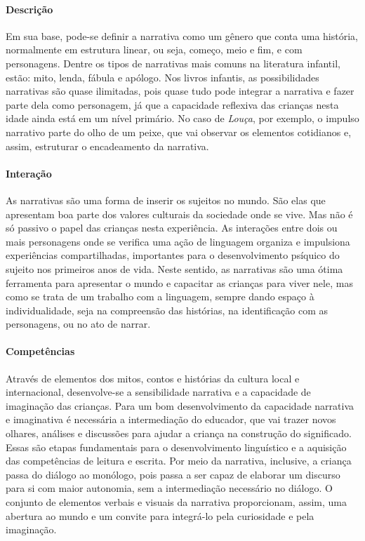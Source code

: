 \documentclass[11pt]{extarticle}
\begin{document}
\paragraph{Descrição} Em sua base, pode-se definir a narrativa como um gênero que conta uma história, normalmente em estrutura linear, ou seja, começo, meio e fim, e com personagens. 
Dentre os tipos de narrativas mais comuns na literatura infantil, estão: mito, lenda, 
fábula e apólogo. Nos livros infantis, as possibilidades narrativas são quase ilimitadas, pois quase tudo pode integrar a narrativa e fazer parte dela como personagem, já que a capacidade reflexiva das crianças nesta idade ainda está em um nível primário. No caso de \textit{Louça}, por exemplo, o impulso narrativo parte do olho de um peixe, que vai observar os elementos cotidianos e, assim, estruturar o encadeamento da narrativa.

\paragraph{Interação} As narrativas são uma forma de inserir os sujeitos no mundo. 
São elas que apresentam boa parte dos valores culturais da sociedade 
onde se vive. Mas não é só passivo o papel das crianças nesta experiência. 
As interações entre dois ou mais personagens onde se verifica
uma ação de linguagem organiza e impulsiona experiências compartilhadas,
importantes para o desenvolvimento psíquico do sujeito nos primeiros anos de vida.
Neste sentido, as narrativas são uma ótima ferramenta para
apresentar o mundo e capacitar as crianças para viver nele, mas como se
trata de um trabalho com a linguagem, sempre dando espaço à individualidade, 
seja na compreensão das histórias, na identificação com as personagens, ou 
no ato de narrar.

\paragraph{Competências} 
Através de elementos dos mitos, contos e histórias da cultura local e internacional, desenvolve-se a sensibilidade narrativa e a capacidade de imaginação das crianças. Para um bom desenvolvimento da capacidade narrativa e imaginativa é necessária a intermediação do educador, que vai trazer novos olhares, análises e discussões para ajudar a criança na construção do significado. Essas são etapas fundamentais para o desenvolvimento linguístico e a aquisição das competências de leitura e escrita. Por meio da narrativa, inclusive, a criança passa do diálogo ao monólogo, pois passa a ser capaz de elaborar um discurso para si com maior autonomia, sem a intermediação necessário no diálogo.
O conjunto de elementos verbais e visuais da narrativa proporcionam, assim,
uma abertura ao mundo e um convite para integrá-lo pela curiosidade e pela imaginação.
\end{document}
